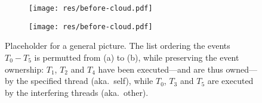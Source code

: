 \begin{figure}[t]
\begin{subfigure}[t]{0.48\textwidth}
\texttt{[image: res/before-cloud.pdf]}
\caption{\label{fig:relink:intro:before}}
\end{subfigure} \hfill
\begin{subfigure}[t]{0.48\textwidth}
\texttt{[image: res/before-cloud.pdf]}
\caption{\label{fig:relink:intro:after}} %
\end{subfigure}%
%
\caption{\label{fig:relink:intro} Placeholder for a general
  picture. The list ordering the events $T_0-T_5$ is permutted from
  (a) to (b), while preserving the event ownership: $T_1$, $T_2$ and
  $T_4$ have been executed---and are thus owned---by the specified
  thread (aka.~self), while $T_0$, $T_3$ and $T_5$ are executed by the
  interfering threads (aka.~other).}
\end{figure}
